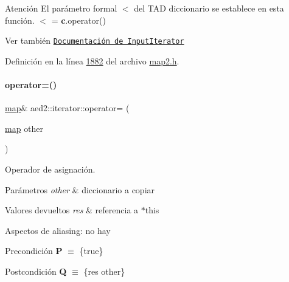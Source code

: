 \begin{DoxyAttention}{Atención}
El parámetro formal $<$ del T\+AD diccionario se establece en esta función. $<$ = {\bfseries c}.operator()
\end{DoxyAttention}
\begin{DoxySeeAlso}{Ver también}
\href{http://en.cppreference.com/w/cpp/concept/InputIterator}{\tt Documentación de Input\+Iterator} 
\end{DoxySeeAlso}


Definición en la línea \hyperlink{map2_8h_source_l01882}{1882} del archivo \hyperlink{map2_8h_source}{map2.\+h}.

\mbox{\label{classaed2_1_1iterator_a7cafd02350b04f7546fa29c17168c18b_a7cafd02350b04f7546fa29c17168c18b}} 
\paragraph{\texorpdfstring{operator=()}{operator=()}}
{\footnotesize\ttfamily \hyperlink{classaed2_1_1map}{map}\& aed2\+::iterator\+::operator= (\begin{DoxyParamCaption}\item[{\hyperlink{classaed2_1_1map}{map}}]{other }\end{DoxyParamCaption})\hspace{0.3cm}{\ttfamily [inline]}}



Operador de asignación. 


\begin{DoxyParams}{Parámetros}
{\em other} & diccionario a copiar \\
\hline
\end{DoxyParams}

\begin{DoxyRetVals}{Valores devueltos}
{\em res} & referencia a $\ast$this\\
\hline
\end{DoxyRetVals}
\begin{DoxyParagraph}{Aspectos de aliasing\+:}
no hay
\end{DoxyParagraph}
\begin{DoxyPrecond}{Precondición}
{\bfseries P} $\equiv$ \{true\} 
\end{DoxyPrecond}
\begin{DoxyPostcond}{Postcondición}
{\bfseries Q} $\equiv$ \{res  other\}
\end{DoxyPostcond}

